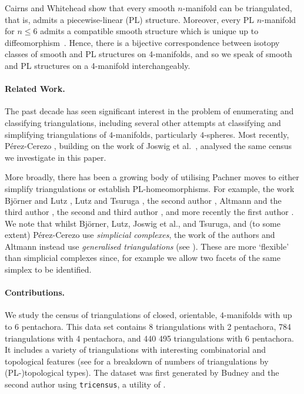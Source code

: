 \documentclass[pdflatex,sn-mathphys-num]{sn-jnl}
\theoremstyle{thmstyleone}%
\theoremstyle{thmstyletwo}%
\theoremstyle{thmstylethree}%
\theoremstyle{remark}
\begin{document}
Cairns \cite{Cairns-TriangulationsC1-35,Cairns-Triangulations61} and Whitehead \cite{Whitehead-C1complexes} show that every smooth $n$-manifold can be triangulated, that is, admits a piecewise-linear (PL) structure. Moreover, every PL $n$-manifold for $n\leq 6$ admits a compatible smooth structure which is unique up to diffeomorphism~\cite{HirschMazur,Munkres-Smoothing}. Hence, there is a bijective correspondence between isotopy classes of smooth and PL structures on 4-manifolds, and so we speak of smooth and PL structures on a 4-manifold interchangeably. 

\paragraph*{Related Work.} The past decade has seen significant interest in the problem of enumerating and classifying triangulations, including several other attempts at classifying and simplifying triangulations of $4$-manifolds, particularly $4$-spheres. Most recently, P\'erez-Cerezo \cite{perez}, building on the work of Joswig et al.\  \cite{joswigLofanoLutzTsuruga-sphereRecog}, analysed the same census we investigate in this paper. 

More broadly, there has been a growing body of utilising Pachner moves to either simplify triangulations or establish PL-homeomorphisms. For example, the work Bj\"orner and Lutz \cite{lutzBistellarFlips}, Lutz and Tsuruga \cite{tsurugaLutz2013constructingcomplicatedspheres}, the second author \cite{burton2011pachner}, Altmann and the third author \cite{AltmannMCMC}, the second and third author \cite{burtonSpreerK3yrf}, and more recently the first author \cite{Burke-SoftwareJoCGver}. We note that whilst Bj\"orner, Lutz, Joswig et al., and Tsuruga, and (to some extent) P\'erez-Cerezo use \emph{simplicial complexes}, the work of the authors and Altmann instead use \emph{generalised triangulations} (see ). These are more `flexible' than simplicial complexes since, for example we allow two facets of the same simplex to be identified.

\paragraph*{Contributions.} We study the census of triangulations of closed, orientable, $4$-manifolds with up to $6$ pentachora. 
This data set contains 8 triangulations with 2 pentachora, 784 triangulations with 4 pentachora, and 440 495 triangulations with 6 pentachora.
It includes a variety of triangulations with interesting combinatorial and topological features (see  for a breakdown of numbers of triangulations by (PL-)topological types). 
The dataset was first generated by Budney and the second author \cite{census} using \texttt{tricensus}, a utility of \cite{Regina}. 
\end{document}
